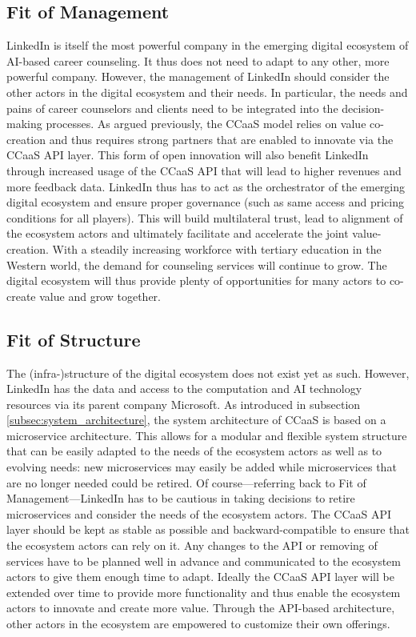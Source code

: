 \subsection{Fit of Management}

LinkedIn is itself the most powerful company in the emerging digital ecosystem of AI-based career
counseling. It thus does not need to adapt to any other, more powerful company. However, the management
of LinkedIn should consider the other actors in the digital ecosystem and their needs. In particular,
the needs and pains of career counselors and clients need to be integrated into the decision-making
processes. As argued previously, the CCaaS model relies on value co-creation and thus requires strong 
partners that are enabled to innovate via the CCaaS API layer. This form of open innovation will also 
benefit LinkedIn through increased usage of the CCaaS API that will lead to higher revenues and more
feedback data. LinkedIn thus has to act as the orchestrator of the emerging digital ecosystem and
ensure proper governance (such as same access and pricing conditions for all players). This will build
multilateral trust, lead to alignment of the ecosystem actors and ultimately facilitate and accelerate
the joint value-creation. With a steadily increasing workforce with tertiary education in the Western
world, the demand for counseling services will continue to grow. The digital ecosystem will thus 
provide plenty of opportunities for many actors to co-create value and grow together.


\subsection{Fit of Structure}

The (infra-)structure of the digital ecosystem does not exist yet as such. However, LinkedIn has the
data and access to the computation and AI technology resources via its parent company Microsoft. As
introduced in subsection \ref{subsec:system_architecture}, the system architecture of CCaaS is based 
on a microservice architecture. This allows for a modular and flexible system structure that can be
easily adapted to the needs of the ecosystem actors as well as to evolving needs: new microservices 
may easily be added while microservices that are no longer needed could be retired. Of course---referring 
back to Fit of Management---LinkedIn has to be cautious in taking decisions to retire microservices 
and consider the needs of the ecosystem actors. The CCaaS API layer should be kept as stable as possible
and backward-compatible to ensure that the ecosystem actors can rely on it. Any changes to the API 
or removing of services have to be planned well in advance and communicated to the ecosystem actors
to give them enough time to adapt. Ideally the CCaaS API layer will be extended over time to provide
more functionality and thus enable the ecosystem actors to innovate and create more value. Through
the API-based architecture, other actors in the ecosystem are empowered to customize their own offerings.


